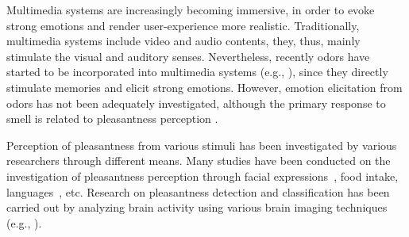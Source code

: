 %




Multimedia systems are increasingly becoming immersive, in order to evoke strong emotions and render user-experience more realistic. Traditionally, multimedia systems include video and audio contents, they, thus, mainly stimulate the visual and auditory senses. Nevertheless, recently odors have started to be incorporated into multimedia systems (e.g., \cite{nakamoto2011olfactory,nakamoto2008cooking,richard2006multi}), since they directly stimulate memories and elicit strong emotions. However, emotion elicitation from odors has not been adequately investigated, although the primary response to smell is related to pleasantness perception \cite{gulas1995right}. 

Perception of pleasantness from various stimuli has been investigated by various researchers through different means. Many studies have been conducted on the investigation of pleasantness perception through facial expressions~\cite{lyons1998coding}, food intake\cite{de2003taste}, languages~\cite{bellezza1986words}, etc. Research on pleasantness detection and classification has been carried out by analyzing brain activity using various brain imaging techniques (e.g., \cite{zatorre2000neural,kringelbach2003activation,kroupi2014eeg}).

